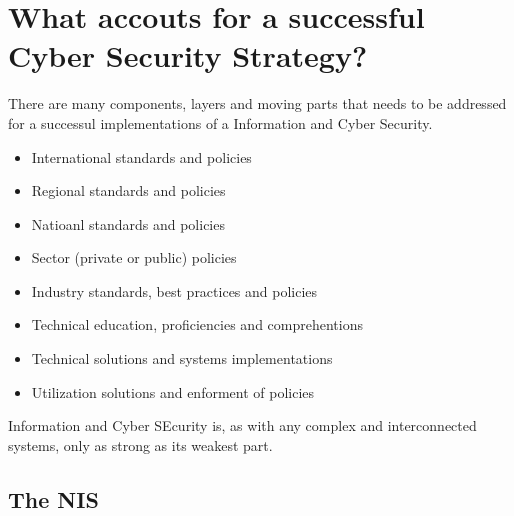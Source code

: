 
\section{What accouts for a successful Cyber Security Strategy?}

There are many components, layers and moving parts that needs to be addressed for a successul implementations of a Information and Cyber Security.

\begin{itemize}
    \item International standards and policies
    \item Regional standards and policies
    \item Natioanl standards and policies
    \item Sector (private or public) policies
    \item Industry standards, best practices and policies
    \item Technical education, proficiencies and comprehentions
    \item Technical solutions and systems implementations
    \item Utilization solutions and enforment of policies
\end{itemize}

Information and Cyber SEcurity is, as with any complex and interconnected systems, only as strong as its weakest part.

\subsection{The NIS}